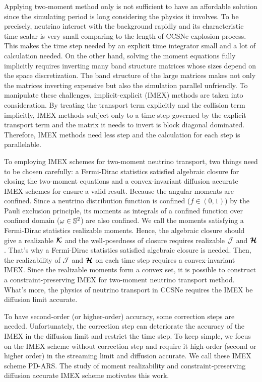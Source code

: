 Applying two-moment method only is not sufficient to have an affordable solution since the simulating period is long considering the physics it involves.
To be precisely, neutrino interact with the background rapidly and its characteristic time scalar is very small comparing to the length of CCSNe explosion process. 
This makes the time step needed by an explicit time integrator small and a lot of calculation needed. 
On the other hand, solving the moment equations fully implicitly requires inverting many band structure matrices whose sizes depend on the space discretization.
The band structure of the large matrices makes not only the matrices inverting expensive but also the simulation parallel unfriendly.
To manipulate these challenges, implicit-explicit (IMEX) methods are taken into consideration.
By treating the transport term explicitly and the collision term implicitly, IMEX methods subject only to a time step governed by the explicit transport term and the matrix it needs to invert is block diagonal dominated.
Therefore, IMEX methods need less step and the calculation for each step is parallelable.  

To employing IMEX schemes for two-moment neutrino transport, two things need to be chosen carefully: a Fermi-Dirac statistics satisfied algebraic closure for closing the two-moment equations and a convex-invariant diffusion accurate IMEX schemes for ensure a valid result.
Because the angular moments are confined.
Since a neutrino distribution function is confined ($f\in(0,1)$) by the Pauli exclusion principle, its moments as integrals of a confined function over confined domain ($\omega\in\mathbb{S}^{2}$) are also confined.
We call the moments satisfying a Fermi-Dirac statistics realizable moments.
Hence, the algebraic closure should give a realizable $\boldsymbol{\mathcal{K}}$ and the well-posedness of closure requires realizable $\mathcal{J}$ and $\boldsymbol{\mathcal{H}}$.
That's why a Fermi-Dirac statistics satisfied algebraic closure is needed.
Then, the realizability of $\mathcal{J}$ and $\boldsymbol{\mathcal{H}}$ on each time step requires a convex-invariant IMEX.
Since the realizable moments form a convex set, it is possible to construct a constraint-preserving IMEX for two-moment neutrino transport method.
What's more, the physics of neutrino transport in CCSNe requires the IMEX be diffusion limit accurate.

To have second-order (or higher-order) accuracy, some correction steps are needed.
Unfortunately, the correction step can deteriorate the accuracy of the IMEX in the diffusion limit and restrict the time step.
To keep simple, we focus on the IMEX scheme without correction step and require it high-order (second or higher order) in the streaming limit and diffusion accurate.
We call these IMEX scheme PD-ARS.
The study of moment realizability and constraint-preserving diffusion accurate IMEX scheme motivates this work.

